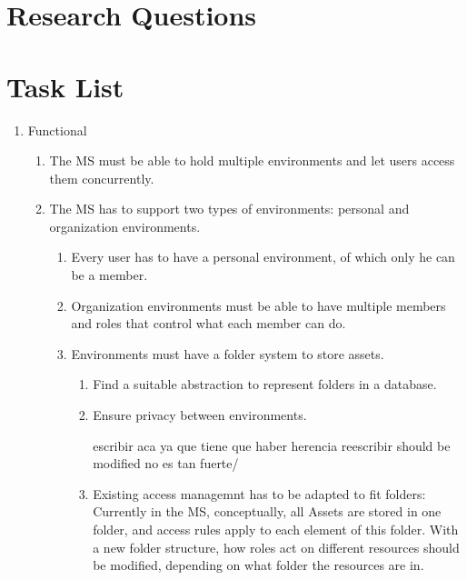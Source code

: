 \chapter{Research Questions}
\label{cha:researchquestions}



\chapter{Task List}
\label{cha:tasklist}


\begin{enumerate}
  \item Functional
  \begin{enumerate}
    \item The MS must be able to hold multiple environments and let users access them concurrently.

    \item The MS has to support two types of environments: personal and organization environments.
    \begin{enumerate}
      \item Every user has to have a personal environment, of which only he can be a member.
      \item Organization environments must be able to have multiple members and roles that control what each member can do.
      \item Environments must have a folder system to store assets.
      \begin{enumerate}
          \item Find a suitable abstraction to represent folders in a database.
          \item Ensure privacy between environments.

          escribir aca ya que tiene que haber herencia
          reescribir should be modified no es tan fuerte/
          \item Existing access managemnt has to be adapted to fit folders: Currently in the MS, conceptually, all Assets are stored in one folder, and access rules apply to each element of this folder.
            With a new folder structure, how roles act on different resources should be modified, depending on what folder the resources are in.
      \end{enumerate}
    \end{enumerate}


\end{enumerate}
\end{enumerate}
